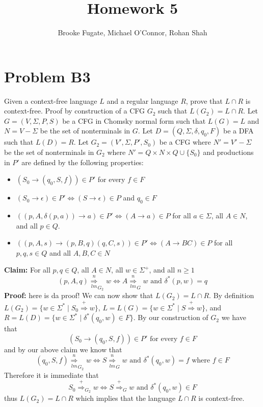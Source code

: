 \documentclass[12pt]{article}
\begin{document}
\pagestyle{plain}
\titleformat{\subsection}[runin]
  {\normalfont\large\bfseries}{\thesubsection}{1em}{}

\title{Homework 5}
\author{Brooke Fugate, Michael O'Connor, Rohan Shah}
\date{}

\maketitle

\section*{Problem B3}
Given a context-free language $L$ and a regular language $R$, prove that
$L\cap R$ is context-free. Proof by construction of a CFG $G_2$ such that
$L(G_2) = L\cap R$. Let $G = (V,\Sigma,P,S)$ be a CFG in Chomsky normal form
such that $L(G) = L$ and $N = V - \Sigma$ be the set of nonterminals in $G$.
Let $D = (Q,\Sigma, \delta, q_0, F)$ be a DFA such that $L(D) = R$.
Let $G_2 = (V',\Sigma,P',S_0)$ be a CFG where $N' = V' - \Sigma$ be the set of
nonterminals in $G_2$ where $N' = Q\times N\times Q \cup \{S_0\}$ and
productions in $P'$ are defined by the following properties:
\begin{itemize}
\item $(S_0 \rightarrow (q_0,S,f)) \in P'$ for every $f \in F$
\item $(S_0 \rightarrow \epsilon) \in P' \iff (S\rightarrow \epsilon) \in P$ and
$q_0 \in F$
\item $((p,A,\delta(p,a)) \rightarrow a) \in P' \iff (A \rightarrow a) \in P$
for all $a \in \Sigma$, all $A \in N$, and all $p \in Q$.
\item $((p,A,s) \rightarrow (p,B,q)(q,C,s)) \in P' \iff (A \rightarrow BC)\in P$
for all $p,q,s \in Q$ and all $A,B,C \in N$
\end{itemize}
\textbf{Claim: } For all $p,q\in Q$, all $A\in N$, all $w\in \Sigma^+$,
and all $n\ge 1$
$$(p,A,q) \underset{lm}{\overset{n}{\Longrightarrow}}_{G_2} w
\iff A \underset{lm}{\overset{n}{\Longrightarrow}}_{G} w
\text{ and } \delta^*(p,w) = q$$
\textbf{Proof: } here is da proof!
\medskip
\newline
We can now show that $L(G_2) = L\cap R$. By definition
$L(G_2) = \{w \in \Sigma^* \mid S_0 \overset{+}{\Longrightarrow} w\}$,
$L = L(G) = \{w \in \Sigma^* \mid S \overset{+}{\Longrightarrow} w\}$, and
$R = L(D) = \{w \in \Sigma^* \mid \delta^*(q_0,w) \in F\}$. By our
construction of $G_2$ we have that
$$(S_0 \rightarrow (q_0,S,f)) \in P' \text{ for every } f \in F$$
and by our above claim we know that
$$(q_0,S,f) \underset{lm}{\overset{n}{\Longrightarrow}}_{G_2} w \iff
S \underset{lm}{\overset{n}{\Longrightarrow}}_{G} w
\text{ and } \delta^*(q_0,w) = f \text{ where } f\in F$$
Therefore it is immediate that
$$ S_0 \overset{+}{\Longrightarrow}_{G_2} w \iff
S \overset{+}{\Longrightarrow}_{G} w \text{ and } \delta^*(q_0,w) \in F$$
thus $L(G_2) = L\cap R$ which implies that the language $L\cap R$ is
context-free.
\end{document}
